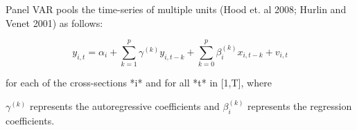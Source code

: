 \documentclass[12pt,a4paper]{article}\usepackage[]{graphicx}\usepackage[]{color}
\begin{document}
Panel VAR pools the time-series of multiple units (Hood et. al 2008; Hurlin and Venet 2001) as follows:

$$ y_{i,t} = \alpha_{i} + \sum_{k=1}^p \gamma^{(k)} y_{i,t-k} + \sum_{k=0}^p \beta_i^{(k)} x_{i,t-k} + v_{i,t} $$

for each of the cross-sections *i* and for all *t* in [1,T], where

$ \gamma^{(k)} $ represents the autoregressive coefficients and $ \beta_i^{(k)} $ represents the regression coefficients.

\end{document}

